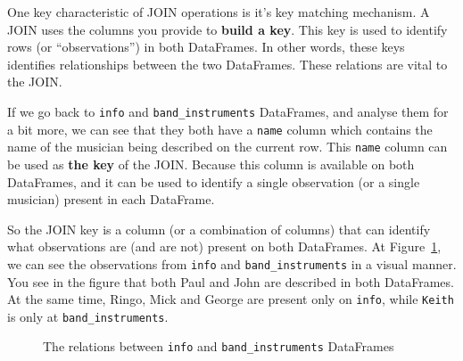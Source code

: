 \documentclass[
  11pt,
  letterpaper,
  DIV=11,
  numbers=noendperiod]{scrreprt}
\begin{document}
One key characteristic of JOIN operations is it's key matching
mechanism. A JOIN uses the columns you provide to \textbf{build a key}.
This key is used to identify rows (or ``observations'') in both
DataFrames. In other words, these keys identifies relationships between
the two DataFrames. These relations are vital to the JOIN.

If we go back to \texttt{info} and \texttt{band\_instruments}
DataFrames, and analyse them for a bit more, we can see that they both
have a \texttt{name} column which contains the name of the musician
being described on the current row. This \texttt{name} column can be
used as \textbf{the key} of the JOIN. Because this column is available
on both DataFrames, and it can be used to identify a single observation
(or a single musician) present in each DataFrame.

So the JOIN key is a column (or a combination of columns) that can
identify what observations are (and are not) present on both DataFrames.
At Figure~\ref{fig-keys-comparison}, we can see the observations from
\texttt{info} and \texttt{band\_instruments} in a visual manner. You see
in the figure that both Paul and John are described in both DataFrames.
At the same time, Ringo, Mick and George are present only on
\texttt{info}, while \texttt{Keith} is only at
\texttt{band\_instruments}.

\begin{figure}


\caption{\label{fig-keys-comparison}The relations between \texttt{info}
and \texttt{band\_instruments} DataFrames}

\end{figure}%
\end{document}
